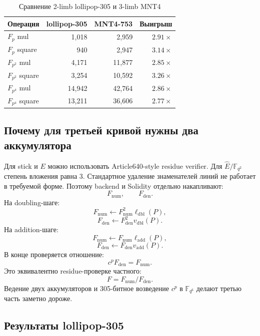 \documentclass[12pt,a4paper]{article}
\begin{document}
\begin{table}[htbp]
\centering
\caption{Сравнение 2-limb lollipop-305 и 3-limb MNT4}
\small
\begin{tabular}{l r r r}
\toprule
Операция & lollipop-305 & MNT4-753 & Выигрыш \\
\midrule
$F_p$ mul & 1,018 & 2,959 & $2.91\times$ \\
$F_p$ square & 940 & 2,947 & $3.14\times$ \\
$F_{p^2}$ mul & 4,171 & 11,877 & $2.85\times$ \\
$F_{p^2}$ square & 3,254 & 10,592 & $3.26\times$ \\
$F_{p^4}$ mul & 14,942 & 42,764 & $2.86\times$ \\
$F_{p^4}$ square & 13,211 & 36,606 & $2.77\times$ \\
\bottomrule
\end{tabular}
\end{table}

\subsection{Почему для третьей кривой нужны два аккумулятора}

Для stick и $E$ можно использовать Article640-style residue verifier. Для
$\widehat{E}/\mathbb{F}_{q^2}$ степень вложения равна $3$. Стандартное удаление
знаменателей линий не работает в требуемой форме. Поэтому backend и Solidity
отдельно накапливают:
\[
    F_{\mathrm{num}},\qquad F_{\mathrm{den}}.
\]
На doubling-шаге:
\[
    F_{\mathrm{num}}\leftarrow
    F_{\mathrm{num}}^2\ell_{\mathrm{dbl}}(P),
\]
\[
    F_{\mathrm{den}}\leftarrow
    F_{\mathrm{den}}^2v_{\mathrm{dbl}}(P).
\]
На addition-шаге:
\[
    F_{\mathrm{num}}\leftarrow
    F_{\mathrm{num}}\ell_{\mathrm{add}}(P),
\]
\[
    F_{\mathrm{den}}\leftarrow
    F_{\mathrm{den}}v_{\mathrm{add}}(P).
\]
В конце проверяется отношение:
\[
    c^p F_{\mathrm{den}}=F_{\mathrm{num}}.
\]
Это эквивалентно residue-проверке частного:
\[
    F=F_{\mathrm{num}}/F_{\mathrm{den}}.
\]
Ведение двух аккумуляторов и 305-битное возведение $c^p$ в
$\mathbb{F}_{q^6}$ делают третью часть заметно дороже.

\subsection{Результаты lollipop-305}
\end{document}
